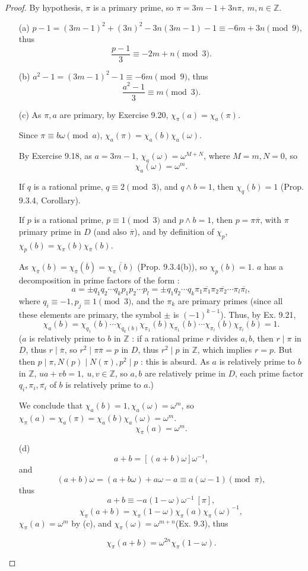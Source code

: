 \documentclass[11pt,a4paper]{article}
\newcommand{\Z}{\mathbb{Z}}
\begin{document}
\begin{proof}
By hypothesis, $\pi$ is a primary prime, so $\pi = 3m-1 + 3n \pi,\ m,n\in \Z$.
\begin{enumerate}
\item[(a)]$p-1 = (3m-1)^2+(3n)^2-3n(3m-1) - 1 \equiv -6m + 3n \pmod 9$, thus $$\frac{p-1}{3} \equiv -2m + n \pmod 3.$$
\item[(b)]$a^2 - 1 = (3m-1)^2-1 \equiv -6m \pmod 9$, thus
$$\frac{a^2-1}{3} \equiv m \pmod 3.$$
\item[(c)]  As $\pi,a$ are primary, by Exercise 9.20, $\chi_\pi(a) = \chi_a(\pi)$.

Since $\pi \equiv b\omega \pmod a$, $\chi_a(\pi) = \chi_a(b) \chi_a(\omega)$.

By Exercise 9.18,  as $a = 3m-1$, $\chi_a(\omega) = \omega^{M+N}$, where $M = m, N = 0$, so $$\chi_a(\omega) = \omega^m.$$

If $q$ is a rational prime, $q \equiv 2 \pmod 3$, and $q \wedge b = 1$, then $\chi_q(b) = 1$ (Prop. 9.3.4, Corollary).

If $p$ is a rational prime, $p \equiv 1 \pmod 3$ and $p \wedge b = 1$, then $p = \pi \overline{\pi}$, with $\pi$ primary prime in $D$ (and also $\overline{\pi}$), and by definition of $\chi_p$, $\chi_p(b) = \chi_\pi(b) \chi_{\overline{\pi}}(b)$.

As $\chi_{\overline{\pi}}(b) = \chi_{\overline{\pi}}(\overline{b}) = \overline{\chi_\pi(b)}$ (Prop. 9.3.4(b)), so $\chi_p(b) = 1$.
$a$ has a decomposition in prime  factors of the form :
$$a = \pm q_1q_2\cdots q_k p_1p_2\cdots p_l = \pm q_1q_2\cdots q_k \pi_1 \overline{\pi_1} \pi_2 \overline{\pi_2}\cdots \pi_l \overline{\pi_l},$$
where $q_i \equiv -1 , p_j \equiv 1 \pmod 3$, and  the $\pi_k$ are primary primes (since all these elements are primary, the symbol $\pm$ is $(-1)^{k-1}$).
Thus, by Ex. 9.21,
$$\chi_a(b) = \chi_{q_1}(b)\cdots \chi_{q_k(b)} \chi_{\pi_1}(b)\chi_{\overline{\pi_1}}(b)\cdots \chi_{\pi_l}(b)\chi_{\overline{\pi_l}}(b) = 1.$$
($a$ is relatively prime to $b$ in $\Z$ : if a rational prime $r$ divides $a,b$, then $r \mid \pi$ in $D$, thus $r \mid \overline{\pi}$, so $r^2 \mid \pi \overline{\pi} = p$ in $D$, thus $r^2 \mid p$ in $\Z$, which implies $r = p$.
 But then $p \mid \pi, N(p) \mid N(\pi), p^2 \mid p$ : this is absurd.
 As $a$ is relatively prime to $b$ in $\Z$, $ua + vb = 1,\ u,v \in \Z$, so $a,b$ are relatively prime in $D$, each prime factor $q_i,\pi_i,\overline{\pi_i}$ of $b$ is relatively prime to $a$.)
 
 We conclude that $\chi_a(b) = 1,\chi_a(\omega) = \omega^m$, so $\chi_\pi(a) = \chi_a(\pi) = \chi_a(b) \chi_a(\omega) = \omega^m$.
 $$\chi_\pi(a) = \omega^m.$$
 \item[(d)] 
 $$a+b = [(a+b) \omega] \omega^{-1},$$
and 
$$(a+b) \omega = (a+b\omega) +a\omega -a \equiv a(\omega-1)\pmod \pi,$$ thus
$$a+b \equiv -a(1-\omega) \omega^{-1} \ [\pi],$$
$$\chi_\pi (a+b) = \chi_\pi(1-\omega) \chi_\pi(a) \chi_\pi(\omega)^{-1},$$
$\chi_\pi(a) = \omega^m$ by (c), and $\chi_\pi(\omega) = \omega^{m+n}$(Ex. 9.3), thus

$$\chi_\pi(a+b) = \omega^{2n} \chi_\pi(1-\omega).$$
\end{enumerate}
\end{proof}
\end{document}
